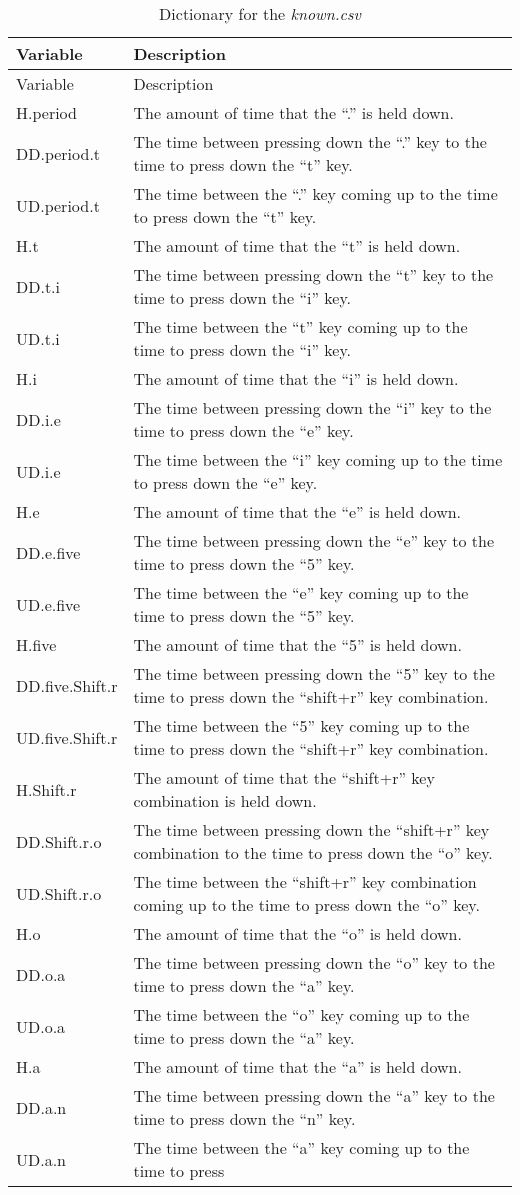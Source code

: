 \documentclass[]{article}
\begin{document}
\begin{longtable}[]{@{}ll@{}}
\caption{Dictionary for the \emph{known.csv}}\tabularnewline
\toprule
Variable & Description\tabularnewline
\midrule
\endfirsthead
\toprule
Variable & Description\tabularnewline
\midrule
\endhead
H.period & The amount of time that the ``.'' is held
down.\tabularnewline
DD.period.t & The time between pressing down the ``.'' key to the time
to press down the ``t'' key.\tabularnewline
UD.period.t & The time between the ``.'' key coming up to the time to
press down the ``t'' key.\tabularnewline
H.t & The amount of time that the ``t'' is held down.\tabularnewline
DD.t.i & The time between pressing down the ``t'' key to the time to
press down the ``i'' key.\tabularnewline
UD.t.i & The time between the ``t'' key coming up to the time to press
down the ``i'' key.\tabularnewline
H.i & The amount of time that the ``i'' is held down.\tabularnewline
DD.i.e & The time between pressing down the ``i'' key to the time to
press down the ``e'' key.\tabularnewline
UD.i.e & The time between the ``i'' key coming up to the time to press
down the ``e'' key.\tabularnewline
H.e & The amount of time that the ``e'' is held down.\tabularnewline
DD.e.five & The time between pressing down the ``e'' key to the time to
press down the ``5'' key.\tabularnewline
UD.e.five & The time between the ``e'' key coming up to the time to
press down the ``5'' key.\tabularnewline
H.five & The amount of time that the ``5'' is held down.\tabularnewline
DD.five.Shift.r & The time between pressing down the ``5'' key to the
time to press down the ``shift+r'' key combination.\tabularnewline
UD.five.Shift.r & The time between the ``5'' key coming up to the time
to press down the ``shift+r'' key combination.\tabularnewline
H.Shift.r & The amount of time that the ``shift+r'' key combination is
held down.\tabularnewline
DD.Shift.r.o & The time between pressing down the ``shift+r'' key
combination to the time to press down the ``o'' key.\tabularnewline
UD.Shift.r.o & The time between the ``shift+r'' key combination coming
up to the time to press down the ``o'' key.\tabularnewline
H.o & The amount of time that the ``o'' is held down.\tabularnewline
DD.o.a & The time between pressing down the ``o'' key to the time to
press down the ``a'' key.\tabularnewline
UD.o.a & The time between the ``o'' key coming up to the time to press
down the ``a'' key.\tabularnewline
H.a & The amount of time that the ``a'' is held down.\tabularnewline
DD.a.n & The time between pressing down the ``a'' key to the time to
press down the ``n'' key.\tabularnewline
UD.a.n & The time between the ``a'' key coming up to the time to press

\end{longtable}
\end{document}
